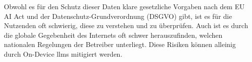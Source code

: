 Obwohl es für den Schutz dieser Daten klare gesetzliche Vorgaben nach dem EU AI Act und der Datenschutz-Grundverordnung (DSGVO) gibt, ist es für die Nutzenden oft schwierig, diese zu verstehen und zu überprüfen. Auch ist es durch die globale Gegebenheit des Internets oft schwer herauszufinden, welchen nationalen Regelungen der Betreiber unterliegt. Diese Risiken können alleinig durch On-Device \acp{llm} mitigiert werden. \cite{llm-privacy}